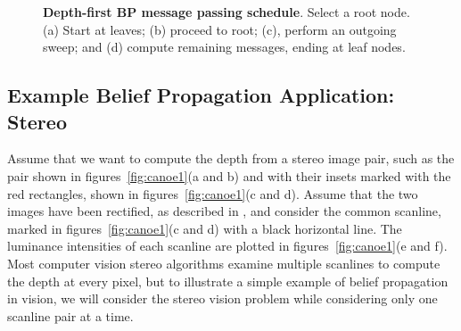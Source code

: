 \begin{figure}
\centerline{
}
\caption{
{\bf Depth-first BP message passing schedule}. Select a root node. (a) Start at leaves; (b) proceed to root; (c), perform an outgoing sweep; and (d) compute remaining messages, ending at leaf nodes.}
\label{fig:men2}
\end{figure}

\subsection{Example Belief Propagation Application: Stereo}

Assume that we want to compute the depth from a stereo image pair, such as the pair shown in figures~\ref{fig:canoe1}(a and b) and with their insets marked with the red rectangles, shown in figures~\ref{fig:canoe1}(c and d).   Assume that the two images have been rectified, as described in \chap{\ref{chap:stereo_vision}}, and consider the common scanline, marked in figures~\ref{fig:canoe1}(c and d) with a black horizontal line.  The luminance intensities of each scanline are plotted in figures~\ref{fig:canoe1}(e and f).  Most computer vision stereo algorithms \cite{Scharstein2002} examine multiple scanlines to compute the depth at every pixel, but to illustrate a simple example of belief propagation in vision, we will consider the stereo vision problem while considering only one scanline pair at a time.


